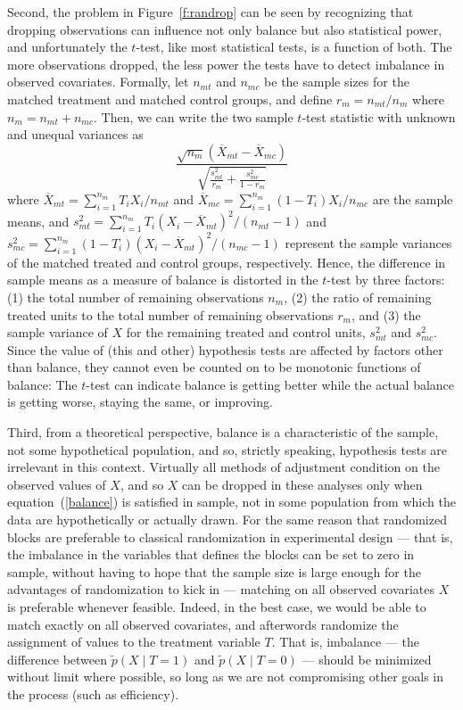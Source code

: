 \documentclass[11pt,titlepage]{article}
\begin{document}
Second, the problem in Figure~\ref{f:randrop} can be seen by
recognizing that dropping observations can influence not only balance
but also statistical power, and unfortunately the $t$-test, like most
statistical tests, is a function of both.  The more observations
dropped, the less power the tests have to detect imbalance in observed
covariates.  Formally, let $n_{mt}$ and $n_{mc}$ be the sample sizes
for the matched treatment and matched control groups, and define
$r_m=n_{mt}/n_m$ where $n_m=n_{mt}+n_{mc}$. Then, we can write the two
sample $t$-test statistic with unknown and unequal variances as
\begin{equation}
  \label{ttest} \frac{\sqrt{n_m}(\overline{X}_{mt}-\overline{X}_{mc})}
               {\sqrt{\frac{s^2_{mt}}{r_m} + \frac{s^2_{mc}}{1-r_m}}}
\end{equation}
where $\overline{X}_{mt}=\sum_{i=1}^{n_m} T_i X_i/n_{mt}$ and
$\overline{X}_{mc}=\sum_{i=1}^{n_m} (1-T_i)X_i/n_{mc}$ are the sample
means, and $s^2_{mt}=\sum_{i=1}^{n_m} T_i(X_i -
\overline{X}_{mt})^2/(n_{mt}-1)$ and $s^2_{mc}=\sum_{i=1}^{n_m}
(1-T_i)(X_i - \overline{X}_{mt})^2/(n_{mc}-1)$ represent the sample
variances of the matched treated and control groups, respectively.
Hence, the difference in sample means as a measure of balance is
distorted in the $t$-test by three factors: (1) the total number of
remaining observations $n_m$, (2) the ratio of remaining treated units
to the total number of remaining observations $r_m$, and (3) the
sample variance of $X$ for the remaining treated and control units,
$s_{mt}^2$ and $s_{mc}^2$.  Since the value of (this and other)
hypothesis tests are affected by factors other than balance, they
cannot even be counted on to be monotonic functions of balance: The
$t$-test can indicate balance is getting better while the actual
balance is getting worse, staying the same, or improving.

Third, from a theoretical perspective, balance is a characteristic of
the sample, not some hypothetical population, and so, strictly
speaking, hypothesis tests are irrelevant in this context.  Virtually
all methods of adjustment condition on the observed values of $X$, and
so $X$ can be dropped in these analyses only when
equation~(\ref{balance}) is satisfied in sample, not in some
population from which the data are hypothetically or actually drawn.
For the same reason that randomized blocks are preferable to classical
randomization in experimental design --- that is, the imbalance in the
variables that defines the blocks can be set to zero in sample,
without having to hope that the sample size is large enough for the
advantages of randomization to kick in --- matching on all observed
covariates $X$ is preferable whenever feasible.  Indeed, in the best
case, we would be able to match exactly on all observed covariates,
and afterwords randomize the assignment of values to the treatment
variable $T$.  That is, imbalance --- the difference between $\tilde
p(X\mid T=1)$ and $\tilde p(X\mid T=0)$ --- should be minimized
without limit where possible, so long as we are not compromising other
goals in the process (such as efficiency).
\end{document}
